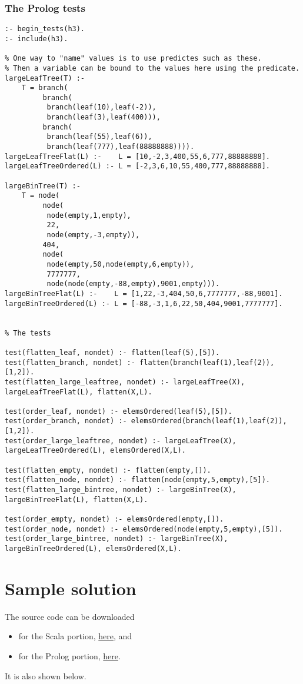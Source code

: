 \documentclass[11pt]{article}
\begin{document}
\subsubsection*{The Prolog tests}
\label{sec:org53212e4}
\begin{verbatim}
:- begin_tests(h3).
:- include(h3).

% One way to "name" values is to use predictes such as these.
% Then a variable can be bound to the values here using the predicate.
largeLeafTree(T) :-
    T = branch(
         branch(
          branch(leaf(10),leaf(-2)),
          branch(leaf(3),leaf(400))),
         branch(
          branch(leaf(55),leaf(6)),
          branch(leaf(777),leaf(88888888)))).
largeLeafTreeFlat(L) :-    L = [10,-2,3,400,55,6,777,88888888].
largeLeafTreeOrdered(L) :- L = [-2,3,6,10,55,400,777,88888888].

largeBinTree(T) :-
    T = node(
         node(
          node(empty,1,empty),
          22,
          node(empty,-3,empty)),
         404,     
         node(
          node(empty,50,node(empty,6,empty)),
          7777777,
          node(node(empty,-88,empty),9001,empty))).
largeBinTreeFlat(L) :-    L = [1,22,-3,404,50,6,7777777,-88,9001].
largeBinTreeOrdered(L) :- L = [-88,-3,1,6,22,50,404,9001,7777777].


% The tests

test(flatten_leaf, nondet) :- flatten(leaf(5),[5]).
test(flatten_branch, nondet) :- flatten(branch(leaf(1),leaf(2)),[1,2]).
test(flatten_large_leaftree, nondet) :- largeLeafTree(X), largeLeafTreeFlat(L), flatten(X,L).

test(order_leaf, nondet) :- elemsOrdered(leaf(5),[5]).
test(order_branch, nondet) :- elemsOrdered(branch(leaf(1),leaf(2)),[1,2]).
test(order_large_leaftree, nondet) :- largeLeafTree(X), largeLeafTreeOrdered(L), elemsOrdered(X,L).

test(flatten_empty, nondet) :- flatten(empty,[]).
test(flatten_node, nondet) :- flatten(node(empty,5,empty),[5]).
test(flatten_large_bintree, nondet) :- largeBinTree(X), largeBinTreeFlat(L), flatten(X,L).

test(order_empty, nondet) :- elemsOrdered(empty,[]).
test(order_node, nondet) :- elemsOrdered(node(empty,5,empty),[5]).
test(order_large_bintree, nondet) :- largeBinTree(X), largeBinTreeOrdered(L), elemsOrdered(X,L).
\end{verbatim}

\section*{Sample solution}
\label{sec:orga7ebedc}
The source code can be downloaded
\begin{itemize}
\item for the Scala portion, \href{./solutions/h3/h3.sc}{here}, and
\item for the Prolog portion, \href{./solutions/h3/h3.pl}{here}.
\end{itemize}
It is also shown below.
\end{document}

